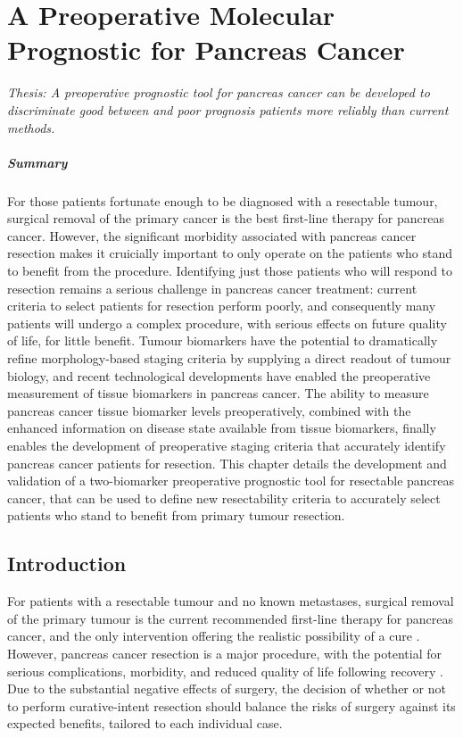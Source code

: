 \documentclass[dissertation.tex]{subfiles}
\begin{document}
\chapter{A Preoperative Molecular Prognostic for Pancreas Cancer}
\label{chap:nomogram}

\emph{Thesis: A preoperative prognostic tool for pancreas cancer can be developed to discriminate good between and poor prognosis patients more reliably than current methods.}

\paragraph{Summary}
For those patients fortunate enough to be diagnosed with a resectable tumour, surgical removal of the primary cancer is the best first-line therapy for pancreas cancer.  However, the significant morbidity associated with pancreas cancer resection makes it cruicially important to only operate on the patients who stand to benefit from the procedure.  Identifying just those patients who will respond to resection remains a serious challenge in pancreas cancer treatment: current criteria to select patients for resection perform poorly, and consequently many patients will undergo a complex procedure, with serious effects on future quality of life, for little benefit.  Tumour biomarkers have the potential to dramatically refine morphology-based staging criteria by supplying a direct readout of tumour biology, and recent technological developments have enabled the preoperative measurement of tissue biomarkers in pancreas cancer.  The ability to measure pancreas cancer tissue biomarker levels preoperatively, combined with the enhanced information on disease state available from tissue biomarkers, finally enables the development of preoperative staging criteria that accurately identify pancreas cancer patients for resection.  This chapter details the development and validation of a two-biomarker preoperative prognostic tool for resectable pancreas cancer, that can be used to define new resectability criteria to accurately select patients who stand to benefit from primary tumour resection.


\section{Introduction}
For patients with a resectable tumour and no known metastases, surgical removal of the primary tumour is the current recommended first-line therapy for pancreas cancer, and the only intervention offering the realistic possibility of a cure \cite{Editors2015}.  However, pancreas cancer resection is a major procedure, with the potential for serious complications, morbidity, and reduced quality of life following recovery \cite{Ho2005}.  Due to the substantial negative effects of surgery, the decision of whether or not to perform curative-intent resection should balance the risks of surgery against its expected benefits, tailored to each individual case.
\end{document}
